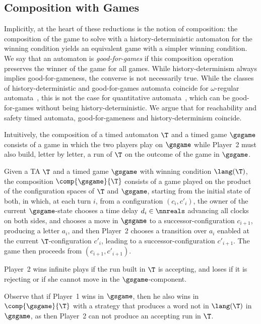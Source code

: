 \subsection{Composition with Games}

Implicitly, at the heart of these reductions is the notion of composition: the composition of the game to solve with a history-deterministic automaton for the winning condition yields an equivalent game with a simpler winning condition. We say that an automaton is \emph{good-for-games} if this composition operation preserves the winner of the game for all games. While history-determinism always implies good-for-gameness, the converse is not necessarily true. While the classes of history-deterministic and good-for-games automata coincide for $\omega$-regular automata~\cite{BL19}, this is not the case for quantitative automata~\cite{BL21}, which can be good-for-games without being history-deterministic. We argue that for reachability and safety timed automata, good-for-gameness and history-determinism coincide.



Intuitively, the composition of a timed automaton $\T$ and a timed game $\gsgame$ 
consists of a game in which the two players play on $\gsgame$ while Player~2 must also build, letter by letter, a run of $\T$ on the outcome of the game in $\gsgame$.

\begin{definition}[Composition]
Given a  TA $\T$ and a timed game $\gsgame$ with winning condition $\lang(\T)$, the composition $\comp{\gsgame}{\T}$ consists of a game played on the product of the configuration spaces of $\T$ and $\gsgame$, starting from the initial state of both, in which, at each turn $i$, from a configuration $(c_i,c'_i)$, 
the owner of the current $\gsgame$-state chooses a time delay $d_i\in \nnreals$ advancing all clocks on both sides, and chooses a move in $\gsgame$ to a successor-configuration $c_{i+1}$, producing a letter $a_i$,
and then Player~2 chooses a transition over $a_i$ enabled at the current $\T$-configuration $c'_i$, leading to a successor-configuration $c'_{i+1}$. The game then proceeds from $(c_{i+1},c'_{i+1})$.

Player~2 wins infinite plays if the run built in $\T$ is accepting, and loses if it is rejecting or if she cannot move in the $\gsgame$-component.

\end{definition}
Observe that if Player~1 wins in $\gsgame$, then he also wins in $\comp{\gsgame}{\T}$ with a strategy that produces a word not in $\lang(\T)$ in $\gsgame$, as then Player~2 can not produce an accepting run in $\T$.


